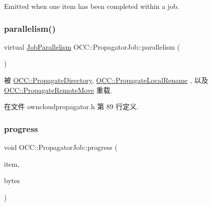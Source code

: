 Emitted when one item has been completed within a job. \mbox{\label{class_o_c_c_1_1_propagator_job_a55105e001d55177f8ccf01acecc5e637}} 
\subsubsection{\texorpdfstring{parallelism()}{parallelism()}}
{\footnotesize\ttfamily virtual \hyperlink{class_o_c_c_1_1_propagator_job_a2527eb0e2b598fc260a2d6449689c156}{Job\+Parallelism} O\+C\+C\+::\+Propagator\+Job\+::parallelism (\begin{DoxyParamCaption}{ }\end{DoxyParamCaption})\hspace{0.3cm}{\ttfamily [virtual]}}



被 \hyperlink{class_o_c_c_1_1_propagate_directory_ad2a8216e88230c7257a5a09aa7e58647}{O\+C\+C\+::\+Propagate\+Directory}, \hyperlink{class_o_c_c_1_1_propagate_local_rename_adfcdea813d4f88fc5f02d9f20f18d477}{O\+C\+C\+::\+Propagate\+Local\+Rename} , 以及 \hyperlink{class_o_c_c_1_1_propagate_remote_move_a489024a48010a86810fa35431fd65d9c}{O\+C\+C\+::\+Propagate\+Remote\+Move} 重载.



在文件 owncloudpropagator.\+h 第 89 行定义.

\mbox{\label{class_o_c_c_1_1_propagator_job_a35dd6d6cd14b4ddbf0b2528508a07804}} 
\subsubsection{\texorpdfstring{progress}{progress}}
{\footnotesize\ttfamily void O\+C\+C\+::\+Propagator\+Job\+::progress (\begin{DoxyParamCaption}\item[{const \hyperlink{class_o_c_c_1_1_sync_file_item}{Sync\+File\+Item} \&}]{item,  }\item[{quint64}]{bytes }\end{DoxyParamCaption})\hspace{0.3cm}{\ttfamily [signal]}}

